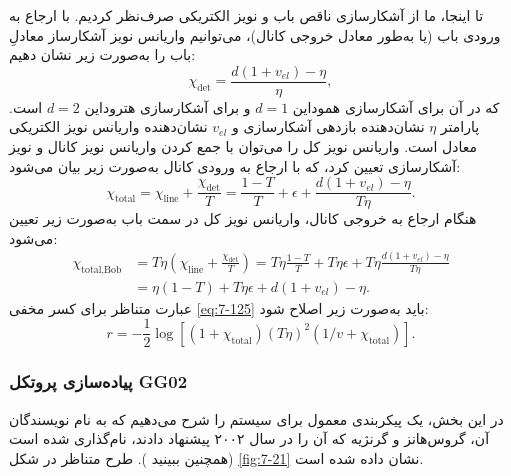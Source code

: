 تا اینجا، ما از آشکارسازی ناقص باب و نویز الکتریکی صرف‌نظر کردیم. با ارجاع به ورودی باب (یا به‌طور معادل خروجی کانال)، می‌توانیم واریانس نویز آشکارساز معادلِ باب را به‌صورت زیر نشان دهیم:
\begin{equation}
	\chi_{\text{det}} = \frac{d(1 + v_{el}) - \eta}{\eta},
	\label{eq:7-126}
\end{equation}
که در آن برای آشکارسازی هموداین $d=1$ و برای آشکارسازی هتروداین $d=2$ است. پارامتر $\eta$ نشان‌دهنده بازدهی آشکارسازی و $v_{el}$ نشان‌دهنده واریانس نویز الکتریکی معادل است. واریانس نویز کل را می‌توان با جمع کردن واریانس نویز کانال و نویز آشکارسازی تعیین کرد، که با ارجاع به ورودی کانال به‌صورت زیر بیان می‌شود:
\begin{equation}
	\chi_{\text{total}} = \chi_{\text{line}} + \frac{\chi_{\text{det}}}{T} = \frac{1 - T}{T} + \epsilon + \frac{d(1 + v_{el}) - \eta}{T\eta}.
	\label{eq:7-127a}
\end{equation}
هنگام ارجاع به خروجی کانال، واریانس نویز کل در سمت باب به‌صورت زیر تعیین می‌شود:
\begin{equation}
	\begin{aligned}
		\chi_{\text{total,Bob}} &= T\eta \left( \chi_{\text{line}} + \frac{\chi_{\text{det}}}{T} \right) = T\eta \frac{1 - T}{T} + T\eta\epsilon + T\eta \frac{d(1 + v_{el}) - \eta}{T\eta} \\
		&= \eta(1 - T) + T\eta\epsilon + d(1 + v_{el}) - \eta.
		\label{eq:7-127b}
	\end{aligned}
\end{equation}
عبارت متناظر برای کسر مخفی \eqref{eq:7-125} باید به‌صورت زیر اصلاح شود:
\begin{equation}
	r = -\frac{1}{2} \log [(1 + \chi_{\text{total}}) (T\eta)^2 (1/v + \chi_{\text{total}})].
	\label{eq:7-128}
\end{equation}









\subsubsection{پیاده‌سازی پروتکل GG02}
\label{subsec:7-6-4}
در این بخش، یک پیکربندی معمول برای سیستم   را شرح می‌دهیم که به نام نویسندگان آن، گروس‌هانز و گرنژیه که آن را در سال ۲۰۰۲ پیشنهاد دادند، نام‌گذاری شده است \cite{7-89} (همچنین ببینید \cite{7-7}). طرح متناظر در شکل \ref{fig:7-21} نشان داده شده است.

